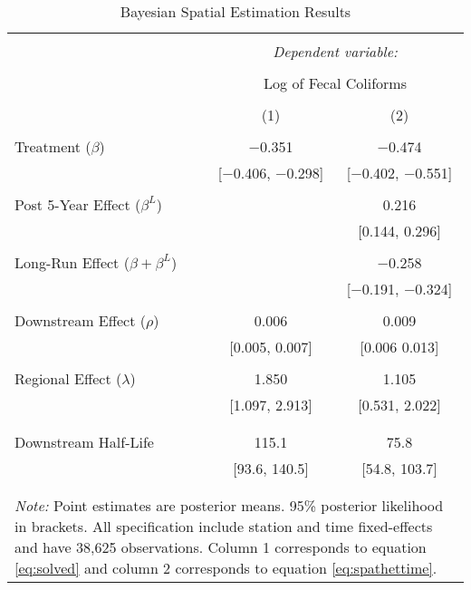 \documentclass[12pt]{article}
\begin{document}
\begin{table}[t!] \centering
	\caption{Bayesian Spatial Estimation Results} 
	\label{tab:spat} 
	\begin{tabular}{@{\extracolsep{5pt}}lcc} 
		\\[-1.8ex]\hline 
		\hline \\[-1.8ex] 
		& \multicolumn{2}{c}{\textit{Dependent variable:}} \\ 
		\cline{2-3} 
		\\[-1.8ex] & \multicolumn{2}{c}{Log of Fecal Coliforms} \\ 
		\\[-1.8ex] & (1) & (2)\\ 
		\hline \\[-1.8ex] 
		Treatment ($\beta$)& $-$0.351 & $-$0.474 \\ 
		& [$-$0.406, $-$0.298] & [$-$0.402, $-$0.551] \\ 
		& & \\ 
		Post 5-Year Effect ($\beta^L$)&  & 0.216 \\ 
		&  & [0.144, 0.296] \\ 
		& & \\ 
                Long-Run Effect ($\beta + \beta^L$)& & $-$0.258 \\
                & & [$-$0.191, $-$0.324] \\
                & & \\
		Downstream Effect ($\rho$) & 0.006 & 0.009 \\ 
		& [0.005, 0.007] & [0.006 0.013] \\ 
		& & \\ 
		Regional Effect ($\lambda$) & 1.850 & 1.105 \\
		& [1.097, 2.913] & [0.531, 2.022] \\ 
		& & \\ 
		\hline \\[-1.8ex]
		Downstream Half-Life & 115.1 & 75.8 \\
		& [93.6, 140.5] & [54.8, 103.7] \\ 
		& & \\ 
		\hline 
		\hline \\[-1.8ex] 
		\multicolumn{3}{p{.75\textwidth}}{\footnotesize{\textit{Note:} Point estimates are posterior means. 95\% posterior likelihood in brackets. All specification include station and time fixed-effects and have 38,625 observations. Column 1 corresponds to equation \eqref{eq:solved} and column 2 corresponds to equation \eqref{eq:spathettime}.}}
	\end{tabular} 
\end{table}
\end{document}
